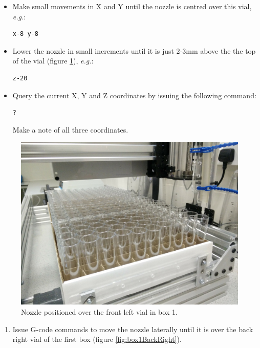 \documentclass[]{book}
\providecommand{\tightlist}{%
  \setlength{\itemsep}{0pt}\setlength{\parskip}{0pt}}
\theoremstyle{definition}
\theoremstyle{definition}
\theoremstyle{remark}
\begin{document}
\begin{itemize}
\item
  Make small movements in X and Y until the nozzle is centred over this
  vial, \emph{e.g.}:

\begin{verbatim}
x-8 y-8
\end{verbatim}
\item
  Lower the nozzle in small increments until it is just 2-3mm above the
  the top of the vial (figure \ref{fig:box1FrontLeft}), \emph{e.g.}:

\begin{verbatim}
z-20
\end{verbatim}
\item
  Query the current X, Y and Z coordinates by issuing the following
  command:

\begin{verbatim}
?
\end{verbatim}

  Make a note of all three coordinates.
\end{itemize}

\begin{figure}

{\centering \includegraphics[width=0.5\linewidth]{images/box1_first_vial} 

}

\caption{Nozzle positioned over the front left vial in box 1.}\label{fig:box1FrontLeft}
\end{figure}

\begin{enumerate}
\def\labelenumi{\arabic{enumi}.}
\setcounter{enumi}{5}
\tightlist
\item
  Issue G-code commands to move the nozzle laterally until it is over
  the back right vial of the first box (figure \ref{fig:box1BackRight}).
\end{enumerate}
\end{document}
